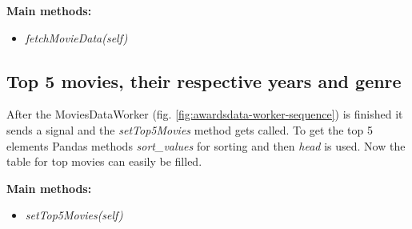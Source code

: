 \documentclass[12pt]{article}
\begin{document}
\textbf{Main methods:}
\begin{itemize}
      \item \textit{fetchMovieData(self)}
\end{itemize}

\subsection{Top 5 movies, their respective years and genre} \label{top-movies}
After the MoviesDataWorker (fig. \ref{fig:awardsdata-worker-sequence}) is finished it sends a
signal and the \textit{setTop5Movies} method gets called. To get the top 5 elements Pandas methods
\textit{sort\_values} for sorting and then \textit{head} is used. Now the table for top movies can
easily be filled.

\textbf{Main methods:}
\begin{itemize}
      \item \textit{setTop5Movies(self)}
\end{itemize}
\end{document}
